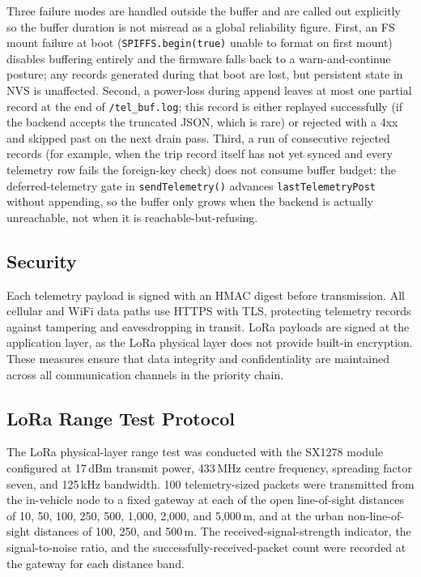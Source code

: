 Three failure modes are handled outside the buffer and are called out explicitly so the buffer duration is not misread as a global reliability figure. First, an FS mount failure at boot (\texttt{SPIFFS.begin(true)} unable to format on first mount) disables buffering entirely and the firmware falls back to a warn-and-continue posture; any records generated during that boot are lost, but persistent state in NVS is unaffected. Second, a power-loss during append leaves at most one partial record at the end of \texttt{/tel\_buf.log}; this record is either replayed successfully (if the backend accepts the truncated JSON, which is rare) or rejected with a 4xx and skipped past on the next drain pass. Third, a run of consecutive rejected records (for example, when the trip record itself has not yet synced and every telemetry row fails the foreign-key check) does not consume buffer budget: the deferred-telemetry gate in \texttt{sendTelemetry()} advances \texttt{lastTelemetryPost} without appending, so the buffer only grows when the backend is actually unreachable, not when it is reachable-but-refusing.

\subsection{Security}
Each telemetry payload is signed with an HMAC digest before transmission. All cellular and WiFi data paths use HTTPS with TLS, protecting telemetry records against tampering and eavesdropping in transit. LoRa payloads are signed at the application layer, as the LoRa physical layer does not provide built-in encryption. These measures ensure that data integrity and confidentiality are maintained across all communication channels in the priority chain.

\subsection{LoRa Range Test Protocol}
The LoRa physical-layer range test was conducted with the SX1278 module configured at 17\,dBm transmit power, 433\,MHz centre frequency, spreading factor seven, and 125\,kHz bandwidth. 100 telemetry-sized packets were transmitted from the in-vehicle node to a fixed gateway at each of the open line-of-sight distances of 10, 50, 100, 250, 500, 1{,}000, 2{,}000, and 5{,}000\,m, and at the urban non-line-of-sight distances of 100, 250, and 500\,m. The received-signal-strength indicator, the signal-to-noise ratio, and the successfully-received-packet count were recorded at the gateway for each distance band.

